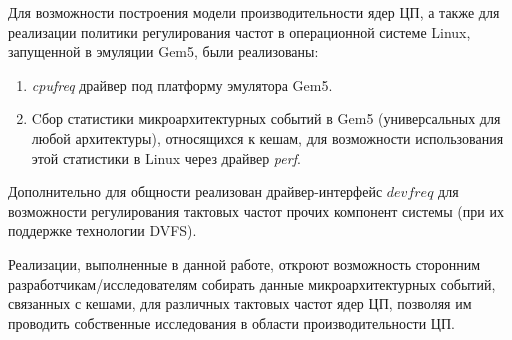     Для возможности построения модели производительности ядер ЦП, а также для реализации политики
    регулирования частот в операционной системе Linux, запущенной в эмуляции Gem5, были реализованы:
    \begin{enumerate}
        \item \textit{cpufreq} драйвер под платформу эмулятора Gem5.
        \item Cбор статистики микроархитектурных событий в Gem5 (универсальных для любой архитектуры),
        относящихся к кешам, для возможности использования этой статистики в Linux
        через драйвер \textit{perf}.
    \end{enumerate}

    Дополнительно для общности реализован драйвер-интерфейс $devfreq$ для возможности регулирования
    тактовых частот прочих компонент системы (при их поддержке технологии DVFS).

    Реализации, выполненные в данной работе, откроют возможность сторонним разработчикам/исследователям
    собирать данные микроархитектурных событий, связанных с кешами, для различных тактовых частот
    ядер ЦП, позволяя им проводить собственные исследования в области производительности ЦП.

\newpage
